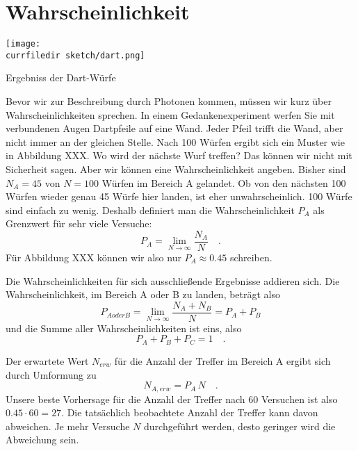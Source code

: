 \section{Wahrscheinlichkeit}

\begin{marginfigure}
    \texttt{[image: \\currfiledir sketch/dart.png]}

    \caption{Ergebniss der Dart-Würfe}
\end{marginfigure}


Bevor wir zur Beschreibung durch Photonen kommen, müssen wir kurz über Wahrscheinlichkeiten sprechen. In einem Gedankenexperiment werfen Sie mit verbundenen Augen Dartpfeile auf eine Wand. Jeder Pfeil trifft die Wand, aber nicht immer an der gleichen Stelle. Nach 100 Würfen ergibt sich ein Muster wie in Abbildung XXX. Wo wird der nächste Wurf treffen? Das können wir nicht mit Sicherheit sagen. Aber wir können eine Wahrscheinlichkeit angeben. Bisher sind $N_A =45$ von $N = 100$ Würfen im Bereich A gelandet. Ob von den nächsten 100 Würfen wieder genau 45 Würfe hier landen, ist eher unwahrscheinlich. 100 Würfe sind einfach zu wenig. Deshalb definiert man die Wahrscheinlichkeit $P_A$ als Grenzwert für sehr viele Versuche:
\begin{equation}
    P_A =  \lim_{N \rightarrow \infty} \frac{N_A}{N} \quad .
\end{equation}
Für Abbildung XXX können wir also nur $P_A \approx 0.45$ schreiben. 


Die Wahrscheinlichkeiten für sich ausschließende Ergebnisse addieren sich. Die Wahrscheinlichkeit, im Bereich A oder B zu landen, beträgt also
\begin{equation}
    P_{A oder B} = \lim_{N \rightarrow \infty} \frac{N_A + N_B}{N} = P_A + P_B
\end{equation}
und die Summe aller Wahrscheinlichkeiten ist eins, also 
\begin{equation}
    P_A + P_B + P_C = 1 \quad .
\end{equation}

Der erwartete Wert $N_{erw}$ für die Anzahl der Treffer im Bereich A ergibt sich durch Umformung zu 
\begin{equation}
    N_{A, erw} = P_A \, N \quad .
\end{equation}
Unsere beste Vorhersage für die Anzahl der Treffer nach 60 Versuchen ist also $0.45 \cdot 60 = 27 $. Die tatsächlich beobachtete Anzahl der Treffer kann davon abweichen. Je mehr Versuche $N$ durchgeführt werden, desto geringer wird die Abweichung sein.



